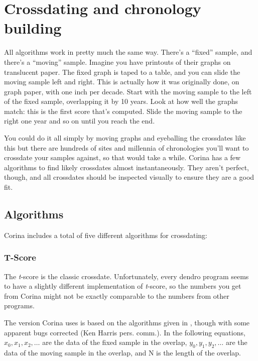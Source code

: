 \chapter{Crossdating and chronology building}
\label{txt:crossdating}

All algorithms work in pretty much the same way. There's a ``fixed'' sample, and there's a ``moving'' sample. Imagine you have printouts of their graphs on translucent paper. The fixed graph is taped to a table, and you can slide the moving sample left and right. This is actually how it was originally done, on graph paper, with one inch per decade. Start with the moving sample to the left of the fixed sample, overlapping it by 10 years. Look at how well the graphs match: this is the first score that's computed. Slide the moving sample to the right one year and so on until you reach the end.

You could do it all simply by moving graphs and eyeballing the crossdates like this but there are hundreds of sites and millennia of chronologies you'll want to crossdate your samples against, so that would take a while. Corina has a few algorithms to find likely crossdates almost instantaneously. They aren't perfect, though, and all crossdates should be inspected visually to ensure they are a good fit. 

\section{Algorithms}
Corina includes a total of five different algorithms for crossdating:


\subsection{T-Score}
The \textit{t}-score is the classic crossdate. Unfortunately, every dendro program seems to have a slightly different implementation of \textit{t}-score, so the numbers you get from Corina might not be exactly comparable to the numbers from other programs. 

The version Corina uses is based on the algorithms given in \citet{Baillie73}, though with some apparent bugs corrected (Ken Harris pers. comm.). In the following equations, $x_{0}, x_{1}, x_{2}, \dots$ are the data of the fixed sample in the overlap, $y_{0}, y_{1}, y_{2}, \dots$ are the data of the moving sample in the overlap, and N is the length of the overlap.

